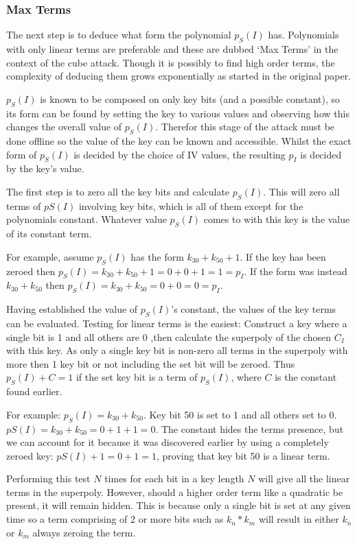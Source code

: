\documentclass{report}
\let\Oldsubsubsection\subsubsection
\renewcommand{\subsubsection}{\FloatBarrier\Oldsubsubsection}
\begin{document}
\subsubsection{Max Terms}
The next step is to deduce what form the polynomial $p_S(I)$ has. Polynomials with only linear terms are preferable and these are dubbed `Max Terms' in the context of the cube attack. Though it is possibly to find high order terms, the complexity of deducing them grows exponentially as started in the original paper\cite{DinurShamir2009}.

$p_S(I)$ is known to be composed on only key bits (and a possible constant), so its form can be found by setting the key to various values and observing how this changes the overall value of $p_S(I)$. Therefor this stage of the attack must be done offline so the value of the key can be known and accessible. Whilst the exact form of $p_S(I)$ is decided by the choice of IV values, the resulting $p_I$ is decided by the key's value.

The first step is to zero all the key bits and calculate $p_S(I)$. This will zero all terms of $pS(I)$ involving key bits, which is all of them except for the polynomials constant. Whatever value $p_S(I)$ comes to with this key is the value of its constant term.

For example, assume $p_S(I)$ has the form $k_{30}+k_{50}+1$. If the key has been zeroed then $p_S(I)=k_{30}+k_{50}+1=0+0+1=1=p_I$. If the form was instead $k_{30}+k_{50}$ then $p_S(I)=k_{30}+k_{50}=0+0=0=p_I$.

Having established the value of $p_S(I)$'s constant, the values of the key terms can be evaluated. Testing for linear terms is the easiest: Construct a key where a single bit is 1 and all others are 0 ,then calculate the superpoly of the chosen $C_I$ with this key. As only a single key bit is non-zero all terms in the superpoly with more then 1 key bit or not including the set bit will be zeroed. Thus $p_S(I)+C=1$ if the set key bit is a term of $p_S(I)$, where $C$ is the constant found earlier.

For example: $p_S(I)=k_{30}+k_{50}$. Key bit 50 is set to 1 and all others set to 0. $pS(I)=k_{30}+k_{50}=0+1+1=0$. The constant hides the terms presence, but we can account for it because it was discovered earlier by using a completely zeroed key: $pS(I)+1=0+1=1$, proving that key bit 50 is a linear term.

Performing this test $N$ times for each bit in a key length $N$ will give all the linear terms in the superpoly. However, should a higher order term like a quadratic be present, it will remain hidden. This is because only a single bit is set at any given time so a term comprising of 2 or more bits such as $k_n*k_m$ will result in either $k_n$ or $k_m$ always zeroing the term.
\end{document}
